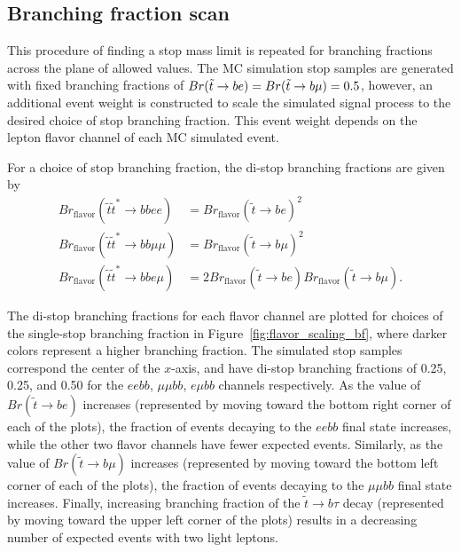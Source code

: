 \FloatBarrier
\subsection{Branching fraction scan}
\label{sec:branching_fraction_scan}

This procedure of finding a stop mass limit is repeated for branching fractions
across the plane of allowed values.
The MC simulation stop samples are generated with fixed branching
fractions of $Br(\tilde{t} \rightarrow be) = Br(\tilde{t} \rightarrow b\mu) = 0.5$, however, an
additional event weight is constructed to scale the simulated signal
process to the desired choice of stop branching fraction.
This event weight depends on the lepton flavor channel of each MC simulated
event.

For a choice of stop branching fraction, the di-stop branching fractions are
given by 
\begin{equation}
  \label{eqn:branching_fractions}
  \begin{aligned}
    Br_\mathrm{flavor}(\tilde{t}\tilde{t}^{*} \rightarrow bbee)     &=
      Br_\mathrm{flavor}(\tilde{t} \rightarrow be )^{2} \\
    Br_\mathrm{flavor}(\tilde{t}\tilde{t}^{*} \rightarrow bb\mu\mu) &=
      Br_\mathrm{flavor}(\tilde{t} \rightarrow b\mu )^{2} \\
    Br_\mathrm{flavor}(\tilde{t}\tilde{t}^{*} \rightarrow bbe\mu)   &=
      2Br_\mathrm{flavor}(\tilde{t} \rightarrow be )
      Br_\mathrm{flavor}(\tilde{t} \rightarrow b\mu ).
  \end{aligned}
\end{equation}

The di-stop branching fractions for each flavor channel are plotted for choices
of the single-stop branching fraction in Figure~\ref{fig:flavor_scaling_bf},
where darker colors represent a higher branching fraction.
The simulated stop samples correspond the center of the $x$-axis, and have
di-stop branching fractions of 0.25, 0.25, and 0.50 for the $eebb$,
$\mu\mu bb$, $e\mu bb$ channels respectively.
As the value of $Br(\tilde{t} \to be)$ increases (represented by moving toward
the bottom right corner of each of the plots), the fraction of events decaying
to the $eebb$ final state increases, while the other two flavor channels
have fewer expected events.
Similarly, as the value of $Br(\tilde{t} \to b\mu)$ increases (represented by
moving toward the bottom left corner of each of the plots), the fraction of
events decaying to the $\mu\mu bb$ final state increases.
Finally, increasing branching fraction of the $\tilde{t} \to b\tau$ decay
(represented by moving toward the upper left corner of the plots) results in a
decreasing number of expected events with two light leptons.


